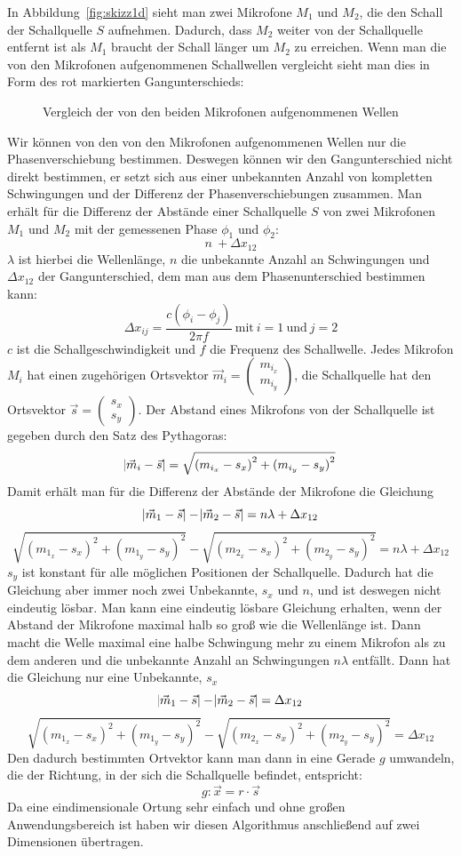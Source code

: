 In Abbildung~\ref{fig:skizz1d} sieht man zwei Mikrofone $M_1$ und $M_2$, die den Schall der Schallquelle $S$ aufnehmen. Dadurch, dass $M_2$ weiter von der Schallquelle entfernt ist als $M_1$ braucht der Schall länger um $M_2$ zu erreichen. Wenn man die von den Mikrofonen aufgenommenen Schallwellen vergleicht sieht man dies in Form des rot markierten Gangunterschieds:
\begin{figure}[H]

\caption{Vergleich der von den beiden Mikrofonen aufgenommenen Wellen}
\label{fig:welle1d}
\end{figure}
Wir können von den von den Mikrofonen aufgenommenen Wellen nur die Phasenverschiebung bestimmen. Deswegen können wir den Gangunterschied nicht direkt bestimmen, er setzt sich aus einer unbekannten Anzahl von kompletten Schwingungen und der Differenz der Phasenverschiebungen zusammen. Man erhält für die Differenz der Abstände einer Schallquelle $S$ von zwei Mikrofonen $M_1$ und $M_2$ mit der gemessenen Phase $\phi_1$ und $\phi_2$: $$n\ + \Delta{x_{12}}$$ $\lambda$ ist hierbei die Wellenlänge, $n$ die unbekannte Anzahl an Schwingungen und $\Delta{x_{12}}$ der Gangunterschied, dem man aus dem Phasenunterschied bestimmen kann:
$$\Delta{x_{ij}} = \frac{c(\phi_i - \phi_j)}{{2\pi}f}\:\textrm{mit}\:i = 1\:\textrm{und}\:j = 2$$
$c$ ist die Schallgeschwindigkeit und $f$ die Frequenz des Schallwelle.
Jedes Mikrofon $M_i$ hat einen zugehörigen Ortsvektor $\vec{m}_i = \begin{pmatrix} m_{i_x} \\ m_{i_y}  \end{pmatrix}$, die Schallquelle hat den Ortsvektor $\vec{s} = \begin{pmatrix} {s_x} \\ {s_y}  \end{pmatrix}$. Der Abstand eines Mikrofons von der Schallquelle ist gegeben durch den Satz des Pythagoras:
$$\abs{\vec{m}_i - \vec{s}} = \sqrt{{(m_{i_x} - s_x)}^2 + {(m_{i_y} - s_y)}^2}$$
Damit erhält man für die Differenz der Abstände der Mikrofone die Gleichung
$$\abs{\vec{m}_1 - \vec{s}} - \abs{\vec{m}_2 - \vec{s}} = n\lambda + \Delta{x_{12}}$$
$$\sqrt{{(m_{1_x} - s_x)}^2 + {(m_{1_y} - s_y)}^2} - \sqrt{{(m_{2_x} - s_x)}^2 + {(m_{2_y} - s_y)}^2} = n\lambda + \Delta{x_{12}}$$$s_y$ ist konstant für alle möglichen Positionen der Schallquelle. Dadurch hat die Gleichung aber immer noch zwei Unbekannte, $s_x$ und $n$, und ist deswegen nicht eindeutig lösbar. Man kann eine eindeutig lösbare Gleichung erhalten, wenn der Abstand der Mikrofone maximal halb so groß wie die Wellenlänge ist. Dann macht die Welle maximal eine halbe Schwingung mehr zu einem Mikrofon als zu dem anderen und die unbekannte Anzahl an Schwingungen $n\lambda$ entfällt. Dann hat die Gleichung nur eine Unbekannte, $s_x$
$$\abs{\vec{m}_1 - \vec{s}} - \abs{\vec{m}_2 - \vec{s}} = \Delta{x_{12}}$$
$$\sqrt{{(m_{1_x} - s_x)}^2 + {(m_{1_y} - s_y)}^2} - \sqrt{{(m_{2_x} - s_x)}^2 + {(m_{2_y} - s_y)}^2} = \Delta{x_{12}}$$
Den dadurch bestimmten Ortvektor kann man dann in eine Gerade $g$ umwandeln, die der Richtung, in der sich die Schallquelle befindet, entspricht:
$$g: \vec{x} = r \cdot \vec{s}$$
Da eine eindimensionale Ortung sehr einfach und ohne großen Anwendungsbereich ist haben wir diesen Algorithmus anschließend auf zwei Dimensionen übertragen.

